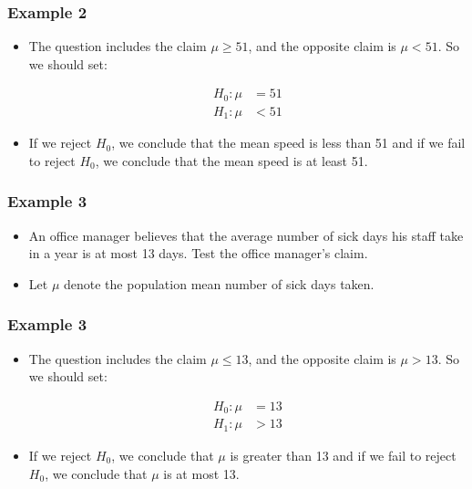 \documentclass[12pt]{beamer}
\begin{document}
\begin{frame}
	\frametitle{Example 2}
	
	\begin{itemize}[label={\color{blue}$\blacktriangleright$}]
		\item The question includes the claim $\mu \geq 51$, and the opposite claim is $\mu < 51$. So we should set:
		
		\begin{align*}
			H_0 : \mu &= 51 \\
			H_1 : \mu &< 51
		\end{align*}
		
		\item If we reject $H_0$, we conclude that the mean speed is less than 51 and if we fail to reject $H_0$, we conclude that the mean speed is at least 51.
	\end{itemize}
	
\end{frame}
\begin{frame}
	\frametitle{Example 3}
	
	\begin{itemize}[label={\color{blue}$\blacktriangleright$}]
		\item An office manager believes that the average number of sick days his staff take in a year is at most 13 days. Test the office manager's claim.
		
		\item Let $\mu$ denote the population mean number of sick days taken.
	\end{itemize}
	
\end{frame}
\begin{frame}
	\frametitle{Example 3}
	
	\begin{itemize}[label={\color{blue}$\blacktriangleright$}]
		\item The question includes the claim $\mu \leq 13$, and the opposite claim is $\mu > 13$. So we should set:
		
		\begin{align*}
			H_0 : \mu &= 13 \\
			H_1 : \mu &> 13
		\end{align*}
		
		\item If we reject $H_0$, we conclude that $\mu$ is greater than 13 and if we fail to reject $H_0$, we conclude that $\mu$ is at most 13.
	\end{itemize}
	
\end{frame}
\end{document}
